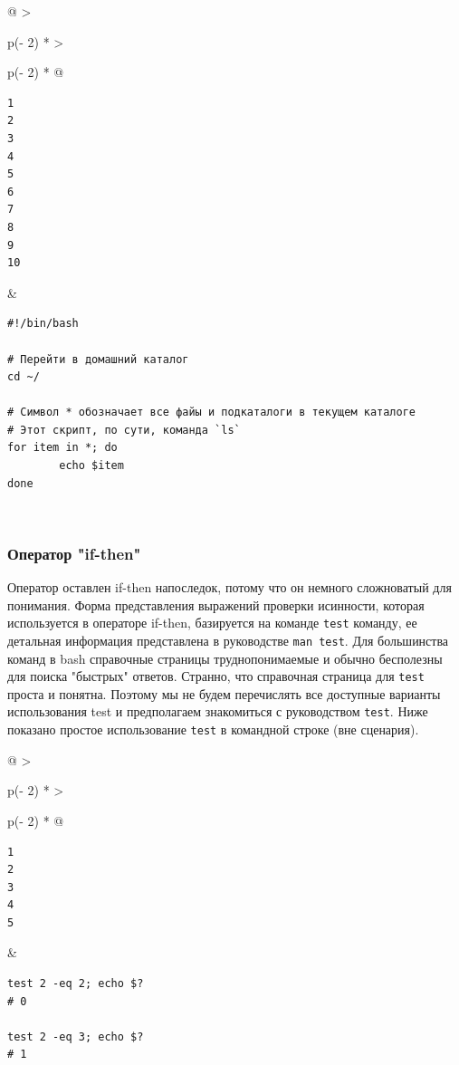 \documentclass{report}
\begin{document}
\begin{longtable}[]{@{}
  >{\raggedright\arraybackslash}p{(\columnwidth - 2\tabcolsep) * }
  >{\raggedright\arraybackslash}p{(\columnwidth - 2\tabcolsep) * }@{}}
\toprule
\endhead
\begin{minipage}[t]{\linewidth}\raggedright
\begin{verbatim}
1
2
3
4
5
6
7
8
9
10
\end{verbatim}
\end{minipage} & \begin{minipage}[t]{\linewidth}\raggedright
\begin{verbatim}
#!/bin/bash

# Перейти в домашний каталог
cd ~/

# Символ * обозначает все файы и подкаталоги в текущем каталоге
# Этот скрипт, по сути, команда `ls`
for item in *; do
        echo $item
done
\end{verbatim}
\end{minipage} \\ \addlinespace
\bottomrule
\end{longtable}

\hypertarget{if-then-statements}{%
\subsubsection{\texorpdfstring{\protect\hyperlink{if-then-statements}{}Оператор
"if-then"}{Оператор "if-then"}}\label{if-then-statements}}

Оператор оставлен if-then напоследок, потому что он немного сложноватый
для понимания. Форма представления выражений проверки исинности, которая
используется в операторе if-then, базируется на команде \texttt{test}
команду, ее детальная информация представлена в руководстве
\texttt{man\ test}. Для большинства команд в bash справочные страницы
труднопонимаемые и обычно бесполезны для поиска "быстрых" ответов.
Странно, что справочная страница для \texttt{test} проста и понятна.
Поэтому мы не будем перечислять все доступные варианты использования
test и предполагаем знакомиться с руководством \texttt{test}. Ниже
показано простое использование \texttt{test} в командной строке (вне
сценария).

\begin{longtable}[]{@{}
  >{\raggedright\arraybackslash}p{(\columnwidth - 2\tabcolsep) * }
  >{\raggedright\arraybackslash}p{(\columnwidth - 2\tabcolsep) * }@{}}
\toprule
\endhead
\begin{minipage}[t]{\linewidth}\raggedright
\begin{verbatim}
1
2
3
4
5
\end{verbatim}
\end{minipage} & \begin{minipage}[t]{\linewidth}\raggedright
\begin{verbatim}
test 2 -eq 2; echo $?
# 0

test 2 -eq 3; echo $?
# 1
\end{verbatim}
\end{minipage} \\ \addlinespace
\bottomrule
\end{longtable}
\end{document}
